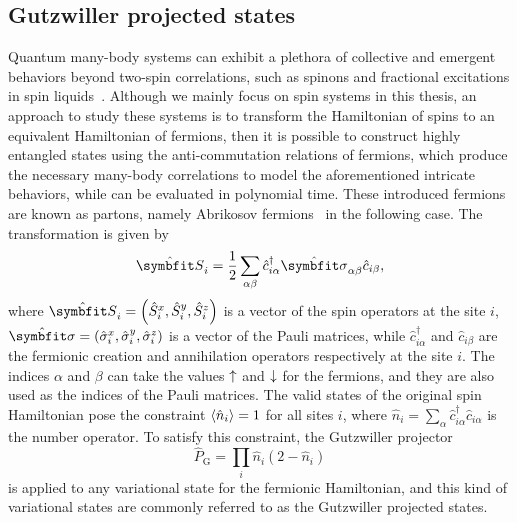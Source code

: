 \subsection{Gutzwiller projected states}

Quantum many-body systems can exhibit a plethora of collective and emergent behaviors beyond two-spin correlations, such as spinons and fractional excitations in spin liquids~\cite{misguich2010quantum, balents2010spin, mila2015frustrated}. Although we mainly focus on spin systems in this thesis, an approach to study these systems is to transform the Hamiltonian of spins to an equivalent Hamiltonian of fermions, then it is possible to construct highly entangled states using the anti-commutation relations of fermions, which produce the necessary many-body correlations to model the aforementioned intricate behaviors, while can be evaluated in polynomial time. These introduced fermions are known as partons, namely Abrikosov fermions~\cite{abrikosov1965electron} in the following case. The transformation is given by
\begin{equation}
\hat{\vS}_i = \frac{1}{2} \sum_{\alpha \beta} \hat{c}^\dagger_{i \alpha} \hat{\vsi}_{\alpha \beta} \hat{c}_{i \beta},
\end{equation}
where $\hat{\vS}_i = \left( \hat{S}^x_i, \hat{S}^y_i, \hat{S}^z_i \right)$ is a vector of the spin operators at the site $i$, $\hat{\vsi} = \left( \hat{\sigma}^x_i, \hat{\sigma}^y_i, \hat{\sigma}^z_i \right)$ is a vector of the Pauli matrices, while $\hat{c}^\dagger_{i \alpha}$ and $\hat{c}_{i \beta}$ are the fermionic creation and annihilation operators respectively at the site $i$. The indices $\alpha$ and $\beta$ can take the values ${\uparrow}$ and ${\downarrow}$ for the fermions, and they are also used as the indices of the Pauli matrices. The valid states of the original spin Hamiltonian pose the constraint $\ev{\hat{n}_i} = 1$ for all sites $i$, where $\hat{n}_i = \sum_\alpha \hat{c}^\dagger_{i \alpha} \hat{c}_{i \alpha}$ is the number operator. To satisfy this constraint, the Gutzwiller projector~\cite{gutzwiller1963effect}
\begin{equation}
\hat{P}_\text{G} = \prod_i \hat{n}_i (2 - \hat{n}_i)
\end{equation}
is applied to any variational state for the fermionic Hamiltonian, and this kind of variational states are commonly referred to as the Gutzwiller projected states.

